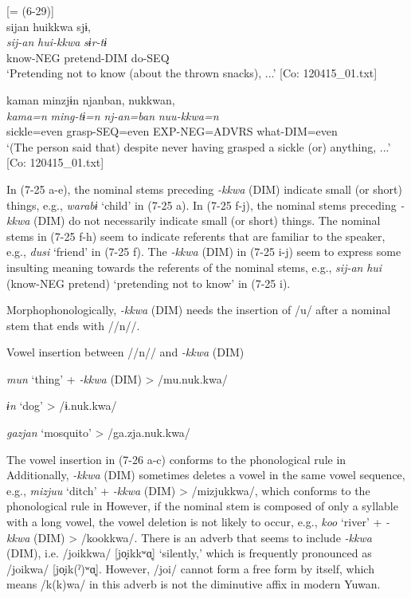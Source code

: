 \ex \label{ex:7:25i}  [= (6-29)]\\

\glll  sijan  huikkwa  sjɨ,\\
\textit{sij-an}  \textit{hui-kkwa}  \textit{sɨr-tɨ}\\
know-NEG  pretend-DIM  do-SEQ\\
\glt ‘Pretending not to know (about the thrown snacks), ...’ [Co: 120415\_01.txt]

\ex \label{ex:7:25j}
\glll  kaman  minzjɨn  njanban,  nukkwan,\footnotemark\\
\textit{kama=n}  \textit{ming-tɨ=n}  \textit{nj-an=ban}  \textit{nuu-kkwa=n}\\
sickle=even  grasp-SEQ=even  EXP-NEG=ADVRS  what-DIM=even\\
\glt ‘(The person said that) despite never having grasped a sickle (or) anything, ...’ [Co: 120415\_01.txt]
\z
\z

In (7-25 a-e), the nominal stems preceding \textit{{}-kkwa} (DIM) indicate small (or short) things, e.g., \textit{warabɨ} ‘child’ in (7-25 a). In (7-25 f-j), the nominal stems preceding \textit{{}-kkwa} (DIM) do not necessarily indicate small (or short) things. The nominal stems in (7-25 f-h) seem to indicate referents that are familiar to the speaker, e.g., \textit{dusi} ‘friend’ in (7-25 f). The \textit{{}-kkwa} (DIM) in (7-25 i-j) seem to express some insulting meaning towards the referents of the nominal stems, e.g., \textit{sij-an} \textit{hui} (know-NEG pretend) ‘pretending not to know’ in (7-25 i).

  Morphophonologically, \textit{{}-kkwa} (DIM) needs the insertion of /u/ after a nominal stem that ends with //n//.

\ea \label{ex:7:26}  Vowel insertion between //n// and \textit{{}-kkwa} (DIM)

  \ex  \textit{mun}  ‘thing’  +  \textit{{}-kkwa} (DIM)  >  /mu.nuk.kwa/

  \ex  \textit{ɨn}  ‘dog’      >  /ɨ.nuk.kwa/

  \ex  \textit{gazjan}  ‘mosquito’      >  /ga.zja.nuk.kwa/
\z
\z

The vowel insertion in (7-26 a-c) conforms to the phonological rule in  Additionally, \textit{{}-kkwa} (DIM) sometimes deletes a vowel in the same vowel sequence, e.g., \textit{mizjuu} ‘ditch’ + \textit{{}-kkwa} (DIM) > /mizjukkwa/, which conforms to the phonological rule in  However, if the nominal stem is composed of only a syllable with a long vowel, the vowel deletion is not likely to occur, e.g., \textit{koo} ‘river’ + \textit{{}-kkwa} (DIM) > /kookkwa/. There is an adverb that seems to include \textit{{}-kkwa} (DIM), i.e. /joikkwa/ [jo̞ikkʷɑ̞] ‘silently,’ which is frequently pronounced as /joikwa/ [jo̞ik(ˀ)ʷɑ̞]. However, /joi/ cannot form a free form by itself, which means /k(k)wa/ in this adverb is not the diminutive affix in modern Yuwan.

